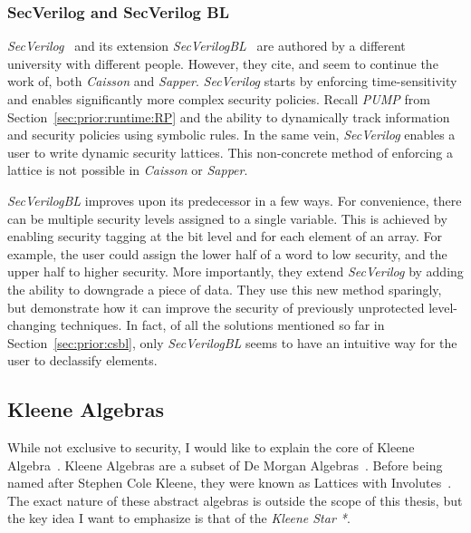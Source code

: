 \documentclass[sigconf,usenames,dvipsnames,svgnames,table]{acmart}
\begin{document}
      \subsubsection{SecVerilog and SecVerilog BL}\label{sec:prior:csbl:sv}
        \textit{SecVerilog}~\cite{2015secverilog} and its extension \textit{SecVerilogBL}~\cite{2017secverilogbl} are authored by a different university with different people.
        However, they cite, and seem to continue the work of, both \textit{Caisson} and \textit{Sapper}.
        \textit{SecVerilog} starts by enforcing time-sensitivity and enables significantly more complex security policies.
        Recall \textit{PUMP} from Section~\ref{sec:prior:runtime:RP} and the ability to dynamically track information and security policies using symbolic rules.
        In the same vein, \textit{SecVerilog} enables a user to write dynamic security lattices.
        This non-concrete method of enforcing a lattice is not possible in \textit{Caisson} or \textit{Sapper}.
        \par

        \textit{SecVerilogBL} improves upon its predecessor in a few ways.
        For convenience, there can be multiple security levels assigned to a single variable.
        This is achieved by enabling security tagging at the bit level and for each element of an array.
        For example, the user could assign the lower half of a word to low security, and the upper half to higher security.
        More importantly, they extend \textit{SecVerilog} by adding the ability to downgrade a piece of data.
        They use this new method sparingly, but demonstrate how it can improve the security of previously unprotected level-changing techniques.
        In fact, of all the solutions mentioned so far in Section~\ref{sec:prior:csbl}, only \textit{SecVerilogBL} seems to have an intuitive way for the user to declassify elements.

    \subsection{Kleene Algebras}\label{sec:prior:ka}
      While not exclusive to security, I would like to explain the core of Kleene Algebra~\cite{1958lwi, 1975idmka, 2009regexd}.
      Kleene Algebras are a subset of De Morgan Algebras~\cite{1975idmka}.
      Before being named after Stephen Cole Kleene, they were known as Lattices with Involutes~\cite{1958lwi}.
      The exact nature of these abstract algebras is outside the scope of this thesis, but the key idea I want to emphasize is that of the \textit{Kleene Star *}.
\end{document}
